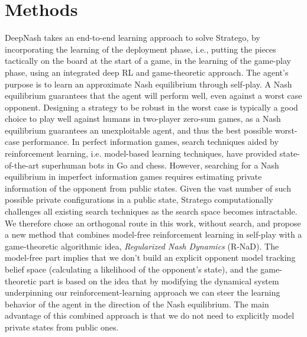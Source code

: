 \section{Methods}
DeepNash takes an end-to-end learning approach to solve Stratego, by incorporating the learning of the deployment phase, i.e., putting the pieces tactically on the board at the start of a game, in the learning of the game-play phase, using an integrated deep RL and game-theoretic approach. The agent's purpose is to learn an approximate Nash equilibrium through self-play. A Nash equilibrium guarantees that the agent will perform well, even against a worst case opponent. Designing a strategy to be robust in the worst case is typically a good choice to play well against humans in two-player zero-sum games, as a Nash equilibrium guarantees an unexploitable agent, and thus the best possible worst-case performance. In perfect information games, search techniques aided by reinforcement learning, i.e. model-based learning techniques, have provided state-of-the-art superhuman bots in Go and chess. However, searching for a Nash equilibrium in imperfect information games requires estimating private information of the opponent from public states. Given the vast number of such possible private configurations in a public state, Stratego computationally challenges all existing search techniques as the search space becomes intractable. We therefore chose an orthogonal route in this work, without search, and propose a new method that combines model-free reinforcement learning in self-play with a game-theoretic algorithmic idea, \emph{Regularized Nash Dynamics} (R-NaD). The model-free part implies that we don't build an explicit opponent model tracking belief space (calculating a likelihood of the opponent's state), and the game-theoretic part is based on the idea that by modifying the dynamical system underpinning our reinforcement-learning approach we can steer the learning behavior of the agent in the direction of the Nash equilibrium. The main advantage of this combined approach is that we do not need to explicitly model private states from public ones.

